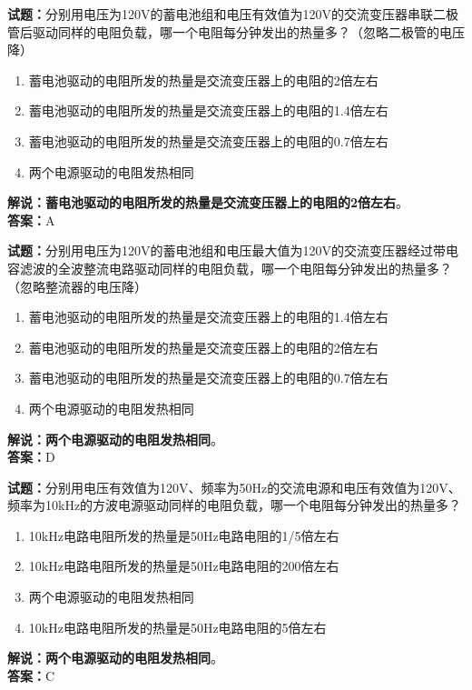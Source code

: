 \documentclass{ctexbook}
\begin{document}
\bigskip


\noindent\textbf{试题：}分别用电压为120V的蓄电池组和电压有效值为120V的交流变压器串联二极管后驱动同样的电阻负载，哪一个电阻每分钟发出的热量多？（忽略二极管的电压降）
\begin{enumerate}[leftmargin=3em]
\item 蓄电池驱动的电阻所发的热量是交流变压器上的电阻的2倍左右
\item 蓄电池驱动的电阻所发的热量是交流变压器上的电阻的1.4倍左右
\item 蓄电池驱动的电阻所发的热量是交流变压器上的电阻的0.7倍左右
\item 两个电源驱动的电阻发热相同
\end{enumerate}
\noindent\textbf{解说：}\textbf{蓄电池驱动的电阻所发的热量是交流变压器上的电阻的2倍左右}。\\\noindent\textbf{答案：}A



\bigskip


\noindent\textbf{试题：}分别用电压为120V的蓄电池组和电压最大值为120V的交流变压器经过带电容滤波的全波整流电路驱动同样的电阻负载，哪一个电阻每分钟发出的热量多？（忽略整流器的电压降）
\begin{enumerate}[leftmargin=3em]
\item 蓄电池驱动的电阻所发的热量是交流变压器上的电阻的1.4倍左右
\item 蓄电池驱动的电阻所发的热量是交流变压器上的电阻的2倍左右
\item 蓄电池驱动的电阻所发的热量是交流变压器上的电阻的0.7倍左右
\item 两个电源驱动的电阻发热相同
\end{enumerate}
\noindent\textbf{解说：}\textbf{两个电源驱动的电阻发热相同}。\\\noindent\textbf{答案：}D



\bigskip


\noindent\textbf{试题：}分别用电压有效值为120V、频率为50Hz的交流电源和电压有效值为120V、频率为10kHz的方波电源驱动同样的电阻负载，哪一个电阻每分钟发出的热量多？
\begin{enumerate}[leftmargin=3em]
\item 10kHz电路电阻所发的热量是50Hz电路电阻的1/5倍左右
\item 10kHz电路电阻所发的热量是50Hz电路电阻的200倍左右
\item 两个电源驱动的电阻发热相同
\item 10kHz电路电阻所发的热量是50Hz电路电阻的5倍左右
\end{enumerate}
\noindent\textbf{解说：}\textbf{两个电源驱动的电阻发热相同}。\\\noindent\textbf{答案：}C
\end{document}

